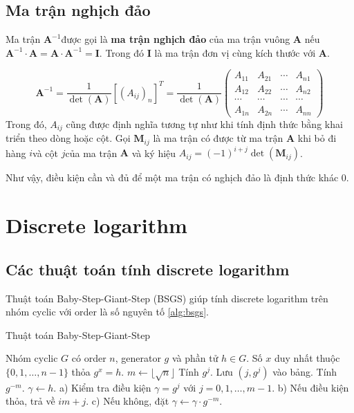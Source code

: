 \documentclass{mynotes}
\theoremstyle{definition}
\begin{document}
\section{Ma trận nghịch đảo}

Ma trận $\bm{A}^{-1}$​ được gọi là \textbf{ma trận nghịch đảo} của ma trận vuông $\bm{A}$ nếu $\bm{A}^{-1} \cdot \bm{A} = \bm{A} \cdot \bm{A}^{-1} = \bm{I}$​. Trong đó $\bm{I}$ là ma trận đơn vị cùng kích thước với $\bm{A}$.

\begin{equation}
    \bm{A}^{-1}=\frac{1}{\det(\bm{A})}[(A_{ij})_n]^T=\frac{1}{\det(\bm{A})}\begin{pmatrix} A_{11} & A_{21} & \cdots & A_{n1} \\ A_{12} & A_{22} & \cdots & A_{n2} \\ \cdots & \cdots & \cdots & \cdots \\ A_{1n} & A_{2n} & \cdots & A_{nn} \end{pmatrix}
\end{equation}
Trong đó, $A_{ij}$ cũng được định nghĩa tương tự như khi tính định thức bằng khai triển theo dòng hoặc cột. Gọi $\bm{M}_{ij}$ là ma trận có được từ ma trận $\bm{A}$ khi bỏ đi hàng $i$​ và cột $j$​ của ma trận $\bm{A}$ và ký hiệu $A_{ij}=(-1)^{i+j} \det (\bm{M}_{ij})$.

Như vậy, điều kiện cần và đủ để một ma trận có nghịch đảo là định thức khác 0.

\chapter{Discrete logarithm}

\section{Các thuật toán tính discrete logarithm}

Thuật toán Baby-Step-Giant-Step (BSGS) giúp tính discrete logarithm trên nhóm cyclic với order là số nguyên tố \ref{alg:bsgs}.

\begin{algorithm}[H]
    \caption{Thuật toán Baby-Step-Giant-Step}
    \label{alg:bsgs}
    \begin{algorithmic}[1]
        \Require Nhóm cyclic $G$ có order $n$, generator $g$ và phần tử $h \in G$.
        \Ensure Số $x$ duy nhất thuộc $\{ 0, 1, \ldots, n-1 \}$ thỏa $g^x = h$.
        $m \gets \lfloor \sqrt{n} \rfloor$
            \State Tính $g^j$. Lưu $(j, g^j)$ vào bảng.
        \EndFor
        \State Tính $g^{-m}$.
        \State $\gamma \gets h$.
            \State a) Kiểm tra điều kiện $\gamma = g^j$ với $j = 0, 1, \ldots, m-1$.
            \State b) Nếu điều kiện thỏa, trả về $im + j$.
            \State c) Nếu không, đặt $\gamma \gets \gamma \cdot g^{-m}$.
        \EndFor
    \end{algorithmic}
\end{algorithm}
\end{document}
